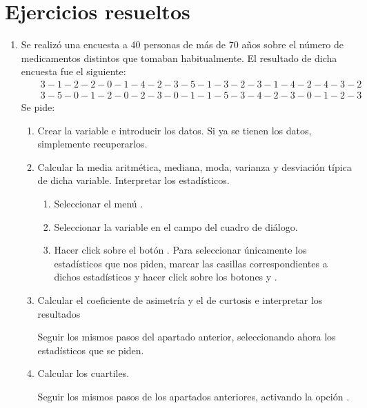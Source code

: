 \clearpage
\newpage


\section{Ejercicios resueltos}
\begin{enumerate}[leftmargin=*]

\item  Se realizó una encuesta a 40 personas de más de 70
años sobre el número de medicamentos distintos que tomaban
habitualmente. El resultado de dicha encuesta fue el siguiente:
\begin{eqnarray*}
&&3-1-2-2-0-1-4-2-3-5-1-3-2-3-1-4-2-4-3-2 \\
&&3-5-0-1-2-0-2-3-0-1-1-5-3-4-2-3-0-1-2-3
\end{eqnarray*}
Se pide:

\begin{enumerate}
\item  Crear la variable  e introducir los
datos. Si ya se tienen los datos, simplemente recuperarlos.

\item  Calcular la media aritmética, mediana, moda, varianza y
desviación típica de dicha variable. Interpretar los estadísticos.
\begin{indicacion}
\begin{enumerate}
\item Seleccionar el menú . \item Seleccionar la variable
 en el campo  del cuadro
de diálogo. \item Hacer click sobre el botón .
Para seleccionar únicamente los estadísticos que nos piden, marcar
las casillas correspondientes a dichos estadísticos y hacer click
sobre los botones  y .
\end{enumerate}
\end{indicacion}


\item  Calcular el coeficiente de asimetría y el de curtosis e
interpretar los resultados
\begin{indicacion}
Seguir los mismos pasos del apartado anterior, seleccionando ahora los estadísticos que se piden.
\end{indicacion}

\item  Calcular los cuartiles.
\begin{indicacion}
Seguir los mismos pasos de los apartados anteriores, activando la opción .
\end{indicacion}
\end{enumerate}



\end{enumerate}
